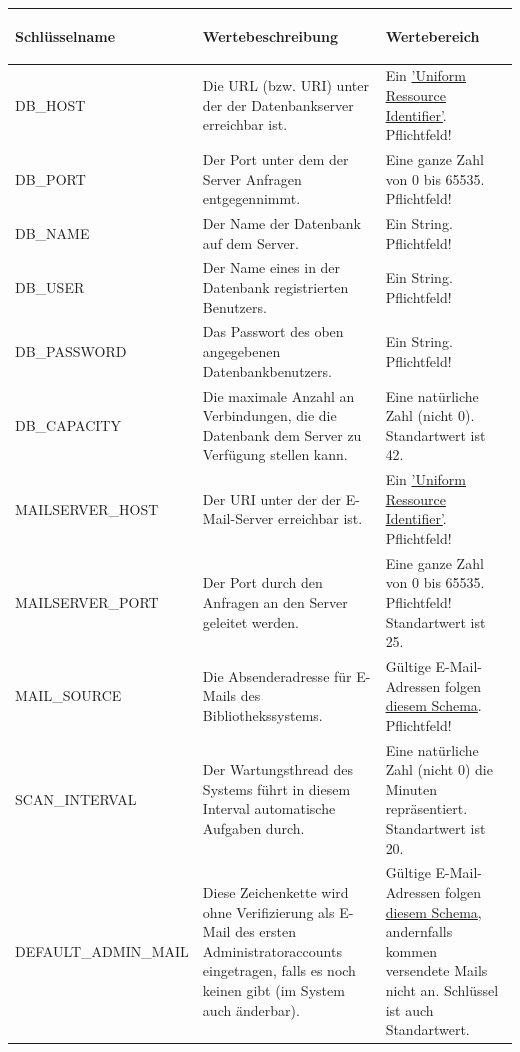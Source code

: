 \documentclass{article}
\begin{document}
\begin{center}
\begin{table}[H]
\begin{tabular} {| m{4cm} | m{6cm} | m{5cm} |}
\hline
\hypertarget{configTabelle}{Schlüsselname} & Wertebeschreibung & Wertebereich \\
\hline
DB\_HOST & Die URL (bzw. URI) unter der der Datenbankserver erreichbar ist.& Ein \hyperlink{https://datatracker.ietf.org/doc/html/rfc3986}{'Uniform Ressource Identifier'}. Pflichtfeld!\\
\hline
DB\_PORT & Der Port unter dem der Server Anfragen entgegennimmt. & Eine ganze Zahl von 0 bis 65535. Pflichtfeld!\\
\hline
DB\_NAME & Der Name der Datenbank auf dem Server. & Ein String. Pflichtfeld!\\
\hline
DB\_USER & Der Name eines in der Datenbank registrierten Benutzers. & Ein String. Pflichtfeld!\\
\hline
DB\_PASSWORD & Das Passwort des oben angegebenen Datenbankbenutzers. & Ein String. Pflichtfeld!\\
\hline
DB\_CAPACITY & Die maximale Anzahl an Verbindungen, die die Datenbank dem Server zu Verfügung stellen kann. & Eine natürliche Zahl (nicht 0). Standartwert ist 42.\\
\hline
MAILSERVER\_HOST & Der URI unter der der E-Mail-Server erreichbar ist. &  Ein \hyperlink{https://datatracker.ietf.org/doc/html/rfc3986}{'Uniform Ressource Identifier'}. Pflichtfeld! \\
\hline
MAILSERVER\_PORT & Der Port durch den Anfragen an den Server geleitet werden. & Eine ganze Zahl von 0 bis 65535. Pflichtfeld! Standartwert ist 25. \\
\hline
MAIL\_SOURCE & Die Absenderadresse für E-Mails des Bibliothekssystems. & Gültige E-Mail-Adressen folgen \hyperlink{https://datatracker.ietf.org/doc/html/rfc5322}{diesem Schema}. Pflichtfeld!\\
\hline
SCAN\_INTERVAL & Der Wartungsthread des Systems führt in diesem Interval automatische Aufgaben durch. & Eine natürliche Zahl (nicht 0) die Minuten repräsentiert. Standartwert ist 20. \\
\hline
DEFAULT\_ADMIN\_MAIL & Diese Zeichenkette wird ohne Verifizierung als E-Mail des ersten Administratoraccounts eingetragen, falls es noch keinen gibt (im System auch änderbar).  & Gültige E-Mail-Adressen folgen \hyperlink{https://datatracker.ietf.org/doc/html/rfc5322}{diesem Schema}, andernfalls kommen versendete Mails nicht an. Schlüssel ist auch Standartwert.\\

\end{tabular}
\end{table}
\end{center}
\end{document}
